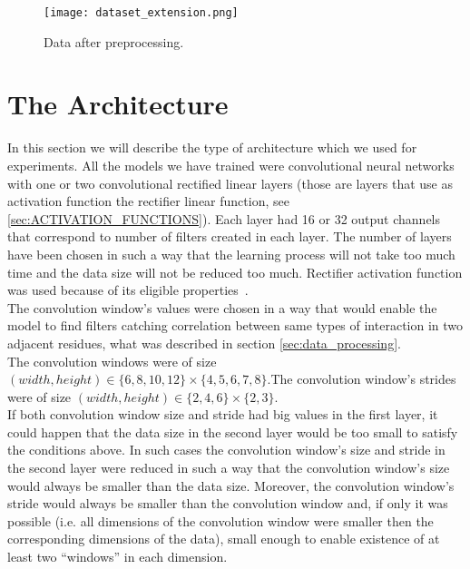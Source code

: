 \documentclass[a4paper,10pt]{report}
\begin{document}
	  \begin{figure}[h!]
	    \centering
	    \texttt{[image: dataset\_extension.png]}
	    \caption{Data after preprocessing.}
	    \label{fig:extended_data}
	  \end{figure}
	  	
      \section{The Architecture}
      In this section we will describe the type of architecture which we used for experiments. All the models we have trained were convolutional neural networks with one or two convolutional rectified linear layers (those are layers that use as activation function the rectifier linear function, see \ref{sec:ACTIVATION_FUNCTIONS}). Each layer had 16 or 32 output channels that correspond to number of filters created in each layer. The number of layers have been chosen in such a way that the learning process will not take too much time and the data size will not be reduced too much. Rectifier activation function was used because of its eligible properties~\cite{DUTCH}.\\ 
   
      The convolution window's values were chosen in a way that would enable the model to find filters catching correlation between same types of interaction in two adjacent residues, what was described in section \ref{sec:data_processing}.\\
      
      The convolution windows were of size $(width, height) \in \{6, 8, 10, 12\} \times \{4, 5, 6, 7, 8\}$.The convolution window's strides were of size $(width, height) \in \{2, 4, 6\} \times \{2, 3\}$.\\
      
      If both convolution window size and stride had big values in the first layer, it could happen that the data size in the second layer would be too small to satisfy the conditions above. In such cases the convolution window's size and stride in the second layer were reduced in such a way that the convolution window's size would always be smaller than the data size. Moreover, the convolution window's stride would always be smaller than the convolution window and, if only it was possible (i.e. all dimensions of the convolution window were smaller then the corresponding dimensions of the data), small enough to enable existence of at least two ``windows'' in each dimension.\\
      
\end{document}
